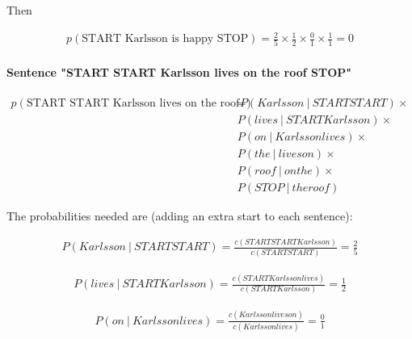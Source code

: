 \documentclass{article}
\newcommand\given[1][]{\:#1\vert\:}
\begin{document}
Then


\begin{equation*}
    \begin{split}
    p(\text{START Karlsson is happy STOP}) =\frac{2}{5} \times \frac{1}{2} \times \frac{0}{1} \times \frac{1}{1} = 0
    \end{split}
\end{equation*}

\paragraph{Sentence "START START Karlsson lives on the roof STOP"}

\begin{equation*}
    \begin{split}
    p(\text{START START Karlsson lives on the roof STOP}) =&\ P(Karlsson \given START
START) \times \\
    & P(lives \given START
Karlsson) \times \\
    & P(on \given Karlsson
lives) \times \\
    & P(the \given lives
on) \times \\
    & P(roof \given on
the) \times \\
    & P(STOP \given the
roof)
    \end{split}
\end{equation*}

The probabilities needed are (adding an extra start to each sentence):

\begin{equation*}
    \begin{split}
    P(Karlsson \given START
START) = \frac{c(START
START
Karlsson)}{ c(START
START)} = \frac{2}{5}
    \end{split}
\end{equation*}

\begin{equation*}
    \begin{split}
    P(lives \given START
Karlsson) = \frac{c(START
Karlsson
lives)}{ c(START
Karlsson)} = \frac{1}{2}
    \end{split}
\end{equation*}

\begin{equation*}
    \begin{split}
    P(on \given Karlsson
lives) = \frac{c(Karlsson
lives
on)}{ c( Karlsson
lives)} = \frac{0}{1}
    \end{split}
\end{equation*}
\end{document}
